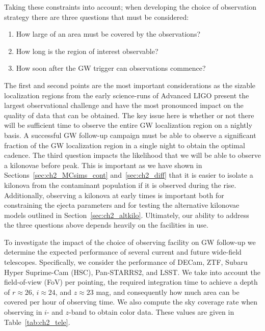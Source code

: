 Taking these constraints into account; when developing the choice of observation strategy there are three questions that must be considered:
\begin{enumerate}
\item How large of an area must be covered by the observations?
\item How long is the region of interest observable?
\item How soon after the GW trigger can observations commence?
\end{enumerate}

The first and second points are the most important considerations as the sizable localization regions from the early science-runs of Advanced LIGO present the largest observational challenge and have the most pronounced impact on the quality of data that can be obtained. The key issue here is whether or not there will be sufficient time to observe the entire GW localization region on a nightly basis. A successful GW follow-up campaign must be able to observe a significant fraction of the GW localization region in a single night to obtain the optimal cadence. The third question impacts the likelihood that we will be able to observe a kilonovae before peak. This is important as we have shown in Sections~\ref{sec:ch2_MCsims_cont} and~\ref{sec:ch2_diff} that it is easier to isolate a kilonova from the contaminant population if it is observed during the rise. Additionally, observing a kilonova at early times is important both for constraining the ejecta parameters and for testing the alternative kilonovae models outlined in Section~\ref{sec:ch2_altkilo}. Ultimately, our ability to address the three questions above depends heavily on the facilities in use.

To investigate the impact of the choice of observing facility on GW follow-up we determine the expected performance of several current and future wide-field telescopes. Specifically, we consider the performance of DECam, ZTF, Subaru Hyper Suprime-Cam (HSC), Pan-STARRS2, and LSST. We take into account the field-of-view (FoV) per pointing, the required integration time to achieve a depth of $r\approx26$, $i\approx24$, and $z\approx23$ mag, and consequently how much area can be covered per hour of observing time. We also compute the sky coverage rate when observing in $i$- and $z$-band to obtain color data. These values are given in Table~\ref{tab:ch2_tele}.

